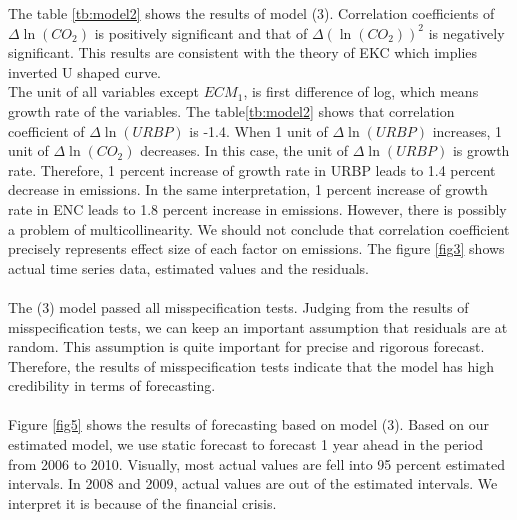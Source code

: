 \documentclass[12pt, a4paper]{article}
\begin{document}
The table \ref{tb:model2} shows the results of model (3). Correlation coefficients of $\varDelta\ln(CO_2)$ is positively significant and that of $\varDelta(\ln(CO_2))^2$ is negatively significant. This results are consistent with the theory of EKC which implies inverted U shaped curve. \\
The unit of all variables except $ECM_1$, is first difference of log, which means growth rate of the variables. The table\ref{tb:model2} shows that correlation coefficient of $\varDelta\ln(URBP)$ is -1.4. When 1 unit of $\varDelta\ln(URBP)$ increases, 1 unit of $\varDelta\ln(CO_2)$ decreases. In this case, the unit of $\varDelta\ln(URBP)$ is growth rate. Therefore, 1 percent increase of growth rate in URBP leads to 1.4 percent decrease in  emissions. In the same interpretation, 1 percent increase of growth rate in ENC leads to 1.8 percent increase in  emissions. However, there is possibly a problem of multicollinearity. We should not conclude that correlation coefficient precisely represents effect size of each factor on  emissions.  
The figure \ref{fig3} shows actual time series data, estimated values and the residuals.\\  
\\
The (3) model passed all misspecification tests. Judging from the results of misspecification tests, we can keep an important assumption that residuals are at random. This assumption is quite important for precise and rigorous forecast. Therefore, the results of misspecification tests indicate that the model has high credibility in terms of forecasting. \\
\\
Figure \ref{fig5} shows the results of forecasting based on model (3). Based on our estimated model, we use static forecast to forecast 1 year ahead in the period from 2006 to 2010. Visually, most actual values are fell into 95 percent estimated intervals. In 2008 and 2009, actual values are out of the estimated intervals. We interpret it is because of the financial crisis.
\end{document}
